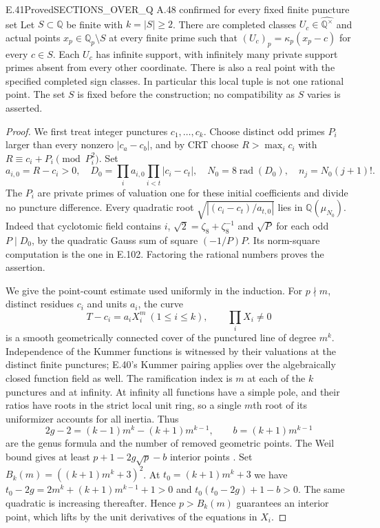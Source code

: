 \begin{result}{E.41}{Proved}{SECTIONS\_OVER\_Q A.48 confirmed for every fixed finite puncture set}
Let $S\subset\mathbb Q$ be finite with $k=|S|\ge2$. There are
completed classes $U_c\in\widehat{\mathbb Q^\times}$ and actual
points $x_p\in\mathbb Q_p\setminus S$ at every finite prime such
that $(U_c)_p=\kappa_p(x_p-c)$ for every $c\in S$. Each $U_c$ has
infinite support, with infinitely many private support primes absent
from every other coordinate. There is also a real point with the
specified completed sign classes. In particular this local tuple is
not one rational point. The set $S$ is fixed before the construction;
no compatibility as $S$ varies is asserted.
\end{result}
\begin{proof}
We first treat integer punctures $c_1,\ldots,c_k$. Choose distinct
odd primes $P_i$ larger than every nonzero $|c_a-c_b|$, and by CRT
choose $R>\max_i c_i$ with $R\equiv c_i+P_i\pmod{P_i^2}$.
Set
\[
 a_{i,0}=R-c_i>0,\quad
 D_0=\prod_i a_{i,0}\prod_{i<t}|c_i-c_t|,\quad
 N_0=8\operatorname{rad}(D_0),\quad n_j=N_0(j+1)!.
\]
The $P_i$ are private primes of valuation one for these initial
coefficients and divide no puncture difference. Every quadratic
root $\sqrt{|(c_i-c_t)/a_{t,0}|}$ lies in
$\mathbb Q(\mu_{N_0})$. Indeed that cyclotomic field contains $i$,
$\sqrt2=\zeta_8+\zeta_8^{-1}$ and $\sqrt P$ for each odd
$P\mid D_0$, by the quadratic Gauss sum of square $(-1/P)P$.
Its norm-square computation is the one in E.102. Factoring the
rational numbers proves the assertion.

We give the point-count estimate used uniformly in the induction.
For $p\nmid m$, distinct residues $c_i$ and units $a_i$, the curve
\[
 T-c_i=a_iX_i^m\ (1\le i\le k),\qquad \prod_iX_i\ne0
\]
is a smooth geometrically connected cover of the punctured line of
degree $m^k$. Independence of the Kummer functions is witnessed by
their valuations at the distinct finite punctures; E.40's Kummer
pairing applies over the algebraically closed function field as
well. The ramification index is $m$ at each of the $k$ punctures
and at infinity. At infinity all functions have a simple pole, and
their ratios have roots in the strict local unit ring, so a single
$m$th root of its uniformizer accounts for all inertia. Thus
\[
 2g-2=(k-1)m^k-(k+1)m^{k-1},\qquad b=(k+1)m^{k-1}
\]
are the genus formula and the number of removed geometric points.
The Weil bound gives at least $p+1-2g\sqrt p-b$ interior points
\cite[(1.5.1), Theorem (1.6), pp.~275--276]{RootDeligne1974}.
Set $B_k(m)=((k+1)m^k+3)^2$. At
$t_0=(k+1)m^k+3$ we have
$t_0-2g=2m^k+(k+1)m^{k-1}+1>0$ and
$t_0(t_0-2g)+1-b>0$. The same quadratic is increasing thereafter.
Hence $p>B_k(m)$ guarantees an interior point, which lifts by the
unit derivatives of the equations in $X_i$.


\end{proof}
